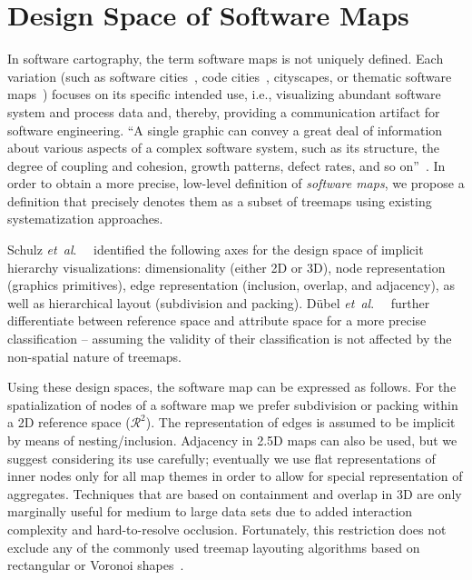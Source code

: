 \documentclass[sigconf]{acmart}
\def\etal{\textit{et~al}.~}
\def\ie{i.e., }
\begin{document}
\section{Design Space of Software Maps} %
\label{VINCI:Sec:DesignSpace}
\par
In software cartography, the term software maps is not uniquely defined. 
Each variation (such as software cities~\cite{wettel2007-comprehension}, code cities~\cite{wettel2008-codecity}, cityscapes, or thematic software maps~\cite{kuhn2008-thematicmaps}) focuses on its specific intended use, \ie visualizing abundant software system and process data and, thereby, providing a communication artifact for software engineering.
\enquote{A single graphic can convey a great deal of information about various aspects of a complex software system, such as its structure, the degree of coupling and cohesion, growth patterns, defect rates, and so on}~\cite{kuhn2008-thematicmaps}.
In order to obtain a more precise, low-level definition of \emph{software maps}, we propose a definition that precisely denotes them as a subset of treemaps using existing systematization approaches.
\par
Schulz \etal~\cite{schulz2011-implicit} identified the following axes for the design space of implicit hierarchy visualizations: dimensionality (either 2D or 3D), node representation (graphics primitives), edge representation (inclusion, overlap, and adjacency), as well as hierarchical layout (subdivision and packing).
D{\"u}bel \etal~\cite{duebel2014-2d3drepresentation} further differentiate between reference space and attribute space for a more precise classification -- assuming the validity of their classification is not affected by the non-spatial nature of treemaps.
\par
Using these design spaces, the software map can be expressed as follows.
For the spatialization of nodes of a software map we prefer subdivision or packing within a 2D reference space ($\mathcal{R}^2$).
The representation of edges is assumed to be implicit by means of nesting/inclusion.
Adjacency in 2.5D maps can also be used, but we suggest considering its use carefully; eventually we use flat representations of inner nodes only for all map themes in order to allow for special representation of aggregates.
Techniques that are based on containment and overlap in 3D are only marginally useful for medium to large data sets due to added interaction complexity and hard-to-resolve occlusion.
Fortunately, this restriction does not exclude any of the commonly used treemap layouting algorithms based on rectangular or Voronoi shapes~\cite{hahn2017-hybrid}.
\end{document}
